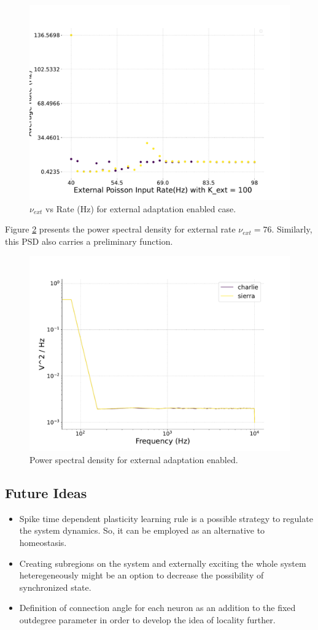 \documentclass[a4paper,12pt]{article}
\begin{document}
\begin{figure}[H] 
    \centering
    \includegraphics[width=0.8\linewidth]{nuext_vs_activity_foxtrot.pdf}
    \caption{$\nu_{ext}$ vs Rate (Hz) for external adaptation enabled case.}
    \label{foxtrot}
\end{figure}
Figure \ref{foxtrot76PSD} presents the power spectral density for external rate $\nu_{ext} = 76$. Similarly, this PSD also carries a preliminary function.
\begin{figure}[H] 
    \centering
    \includegraphics[width=0.8\linewidth]{nu_ext_76PSD_homeostasis_foxtrot.pdf}
    \caption{Power spectral density for external adaptation enabled.}
    \label{foxtrot76PSD}
\end{figure}

\subsection{Future Ideas}
\begin{itemize}
    \item Spike time dependent plasticity learning rule is a possible strategy to regulate the system dynamics. So, it can be employed as an alternative to homeostasis.
    \item Creating subregions on the system and externally exciting the whole system heteregeneously might be an option to decrease the possibility of synchronized state.
    \item Definition of connection angle for each neuron as an addition to the fixed outdegree parameter in order to develop the idea of locality further.
\end{itemize}
\end{document}
